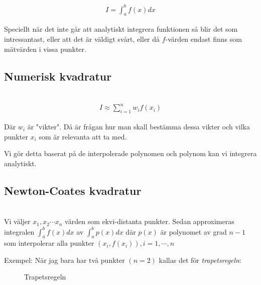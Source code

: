 \begin{equation*}
  \begin{gathered}
    I = \int_{a}^{b}f(x)dx
  \end{gathered}
\end{equation*}
\par\bigskip

\noindent Speciellt när det inte går att analytiskt integrera funktionen så blir det som intressantast, eller att det är väldigt svårt, eller då $f$-värden endast finns som mätvärden i vissa punkter.
\par\bigskip

\subsection{Numerisk kvadratur}\hfill\\

\begin{equation*}
  \begin{gathered}
    I\approx \sum_{i=1}^{n}w_if(x_i)
  \end{gathered}
\end{equation*}
\par\bigskip
\noindent Där $w_i$ är "vikter". Då är frågan hur man skall bestämma dessa vikter och vilka punkter $x_i$ som är relevanta att ta med.\par\noindent Vi gör detta baserat på de interpolerade polynomen och polynom kan vi integrera analytiskt.
\par\bigskip

\subsection{Newton-Coates kvadratur}\hfill\\

\noindent Vi väljer $x_1,x_2\cdots x_n$ värden som ekvi-distanta punkter. Sedan approximeras integralen $\int_a^b f(x)dx$ av $\int_a^b p(x)dx$ där $p(x)$ är polynomet av grad $n-1$ som interpolerar alla punkter $(x_i, f(x_i)), i=1,\cdots,n$
\par\bigskip

\noindent Exempel: När jag bara har två punkter $(n=2)$ kallas det för \textit{trapetsregeln}:

\begin{figure}[ht]
    \centering
    \caption{Trapetsregeln}
    \label{fig:trapetsregeln}
\end{figure}
\par\bigskip


